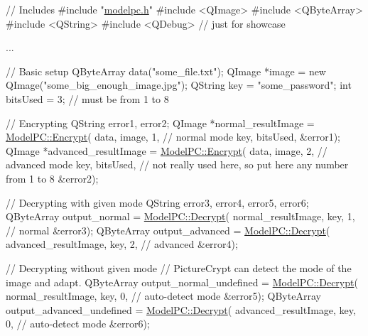 \begin{DoxyCode}
\textcolor{comment}{// Includes}
\textcolor{preprocessor}{#include "\hyperlink{modelpc_8h}{modelpc.h}"}
\textcolor{preprocessor}{#include <QImage>}
\textcolor{preprocessor}{#include <QByteArray>}
\textcolor{preprocessor}{#include <QString>}
\textcolor{preprocessor}{#include <QDebug>} \textcolor{comment}{// just for showcase}

...

\textcolor{comment}{// Basic setup}
QByteArray data(\textcolor{stringliteral}{"some\_file.txt"});
QImage *image = \textcolor{keyword}{new} QImage(\textcolor{stringliteral}{"some\_big\_enough\_image.jpg"});
QString key = \textcolor{stringliteral}{"some\_password"};
\textcolor{keywordtype}{int} bitsUsed = 3; \textcolor{comment}{// must be from 1 to 8}

\textcolor{comment}{// Encrypting}
QString error1, error2;
QImage *normal\_resultImage = \hyperlink{class_model_p_c_aad427b77cf44b5dadc5523ea03272c85}{ModelPC::Encrypt}(
    data,
    image,
    1, \textcolor{comment}{// normal mode}
    key,
    bitsUsed,
    &error1);
QImage *advanced\_resultImage = \hyperlink{class_model_p_c_aad427b77cf44b5dadc5523ea03272c85}{ModelPC::Encrypt}(
    data,
    image,
    2, \textcolor{comment}{// advanced mode}
    key,
    bitsUsed, \textcolor{comment}{// not really used here, so put here any number from 1 to 8}
    &error2);

\textcolor{comment}{// Decrypting with given mode}
QString error3, error4, error5, error6;
QByteArray output\_normal = \hyperlink{class_model_p_c_afbca3c9c9b7d92f3a5cc81510ef06cc3}{ModelPC::Decrypt}(
    normal\_resultImage,
    key,
    1, \textcolor{comment}{// normal}
    &error3);
QByteArray output\_advanced = \hyperlink{class_model_p_c_afbca3c9c9b7d92f3a5cc81510ef06cc3}{ModelPC::Decrypt}(
    advanced\_resultImage,
    key,
    2, \textcolor{comment}{// advanced}
    &error4);

\textcolor{comment}{// Decrypting without given mode}
\textcolor{comment}{// PictureCrypt can detect the mode of the image and adapt.}
QByteArray output\_normal\_undefined = \hyperlink{class_model_p_c_afbca3c9c9b7d92f3a5cc81510ef06cc3}{ModelPC::Decrypt}(
    normal\_resultImage,
    key,
    0, \textcolor{comment}{// auto-detect mode}
    &error5);
QByteArray output\_advanced\_undefined = \hyperlink{class_model_p_c_afbca3c9c9b7d92f3a5cc81510ef06cc3}{ModelPC::Decrypt}(
    advanced\_resultImage,
    key,
    0, \textcolor{comment}{// auto-detect mode}
    &error6);


\end{DoxyCode}
